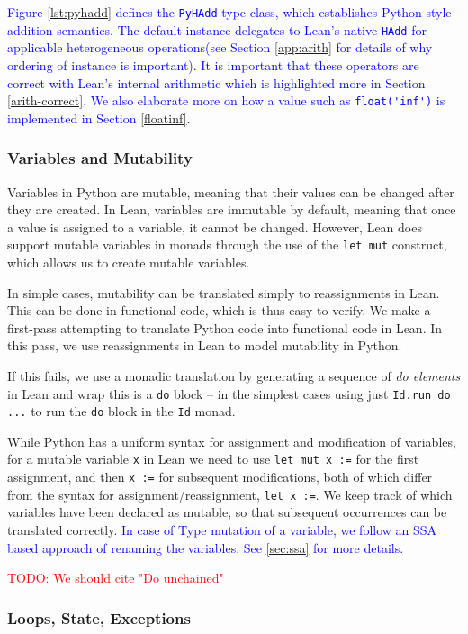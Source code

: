 \documentclass{article}
\newcommand{\code}{\lstinline}
\newcommand{\todo}[1]{\textcolor{red}{TODO: #1}}
\newcommand{\suggest}[1]{\textcolor{blue}{#1}}
\begin{document}
\suggest{
Figure \ref{lst:pyhadd} defines the \code{PyHAdd} type class, which establishes Python-style addition semantics. The default instance delegates to Lean's native \code{HAdd} for applicable heterogeneous operations(see Section \ref{app:arith} for details of why ordering of instance is important). It is important that these operators are correct with Lean's internal arithmetic which is highlighted more in Section \ref{arith-correct}. We also elaborate more on how a value such as \code{float('inf')} is implemented in Section \ref{floatinf}.}

\subsubsection{Variables and Mutability}
Variables in Python are mutable, meaning that their values can be changed after they are created. In Lean, variables are immutable by default, meaning that once a value is assigned to a variable, it cannot be changed. However, Lean does support mutable variables in monads through the use of the \code{let mut} construct, which allows us to create mutable variables.

In simple cases, mutability can be translated simply to reassignments in Lean. This can be done in functional code, which is thus easy to verify. We make a first-pass attempting to translate Python code into functional code in Lean. In this pass, we use reassignments in Lean to model mutability in Python.

If this fails, we use a monadic translation by generating a sequence of \emph{do elements} in Lean and wrap this is a \code{do} block -- in the simplest cases using just \code{Id.run do ...} to run the \code{do} block in the \code{Id} monad.

While Python has a uniform syntax for assignment and modification of variables, for a mutable variable \code{x} in Lean we need to use \code{let mut x :=} for the first assignment, and then \code{x :=} for subsequent modifications, both of which differ from the syntax for assignment/reassignment, \code{let x :=}. We keep track of which variables have been declared as mutable, so that subsequent occurrences can be translated correctly. \suggest{In case of Type mutation of a variable, we follow an SSA based approach of renaming the variables. See \ref{sec:ssa} for more details.}

\todo{We should cite "Do unchained"}

\subsubsection{Loops, State, Exceptions}\label{sec:loops}
\end{document}
